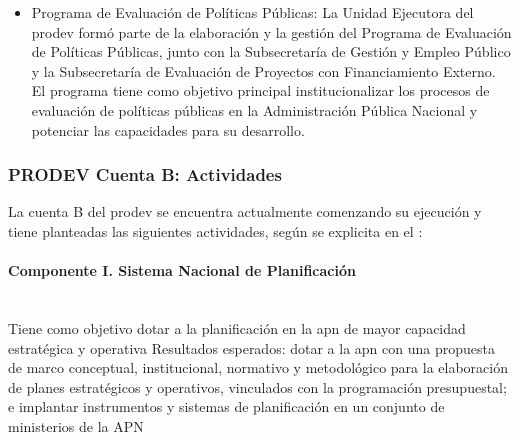 \begin{itemize}
        \item Programa de Evaluación de Políticas Públicas: La Unidad Ejecutora del \ac{prodev} formó parte de la elaboración y la gestión del Programa de Evaluación de Políticas Públicas, junto con la Subsecretaría de Gestión y Empleo Público y la Subsecretaría de Evaluación de Proyectos con Financiamiento Externo. El programa tiene como objetivo principal institucionalizar los procesos de evaluación de políticas públicas en la Administración Pública Nacional y potenciar las capacidades para su desarrollo.
    \end{itemize}

\subsubsection{PRODEV Cuenta B: Actividades}
La cuenta B del \ac{prodev} se encuentra actualmente comenzando su ejecución y tiene planteadas las siguientes actividades, según se explicita en el :
\paragraph{Componente I. Sistema Nacional de Planificación} \mbox{}\\

Tiene como objetivo dotar a la planificación en la \ac{apn} de mayor capacidad estratégica y operativa
Resultados esperados: dotar a la \ac{apn} con una propuesta de marco conceptual, institucional, normativo y metodológico para la elaboración de planes estratégicos y operativos, vinculados con la programación presupuestal; e implantar instrumentos y sistemas de planificación en un conjunto de ministerios de la APN

